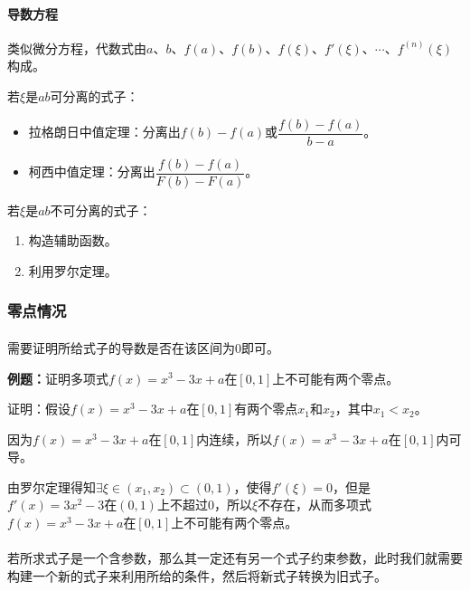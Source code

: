 \paragraph{导数方程} \leavevmode \medskip

类似微分方程，代数式由$a$、$b$、$f(a)$、$f(b)$、$f(\xi)$、$f'(\xi)$、$\cdots$、$f^{(n)}(\xi)$构成。

若$\xi$是$ab$可分离的式子：

\begin{itemize}
    \item 拉格朗日中值定理：分离出$f(b)-f(a)$或$\dfrac{f(b)-f(a)}{b-a}$。
    \item 柯西中值定理：分离出$\dfrac{f(b)-f(a)}{F(b)-F(a)}$。
\end{itemize}

若$\xi$是$ab$不可分离的式子：

\begin{enumerate}
    \item 构造辅助函数。
    \item 利用罗尔定理。
\end{enumerate}

\subsubsection{零点情况}

\paragraph{} \leavevmode \medskip

需要证明所给式子的导数是否在该区间为0即可。

\textbf{例题：}证明多项式$f(x)=x^3-3x+a$在$[0,1]$上不可能有两个零点。

证明：假设$f(x)=x^3-3x+a$在$[0,1]$有两个零点$x_1$和$x_2$，其中$x_1<x_2$。

因为$f(x)=x^3-3x+a$在$[0,1]$内连续，所以$f(x)=x^3-3x+a$在$[0,1]$内可导。

由罗尔定理得知$\exists\xi\in(x_1,x_2)\subset(0,1)$，使得$f'(\xi)=0$，但是$f'(x)=3x^2-3$在$(0,1)$上不超过0，所以$\xi$不存在，从而多项式$f(x)=x^3-3x+a$在$[0,1]$上不可能有两个零点。

\paragraph{} \leavevmode \medskip

若所求式子是一个含参数，那么其一定还有另一个式子约束参数，此时我们就需要构建一个新的式子来利用所给的条件，然后将新式子转换为旧式子。

